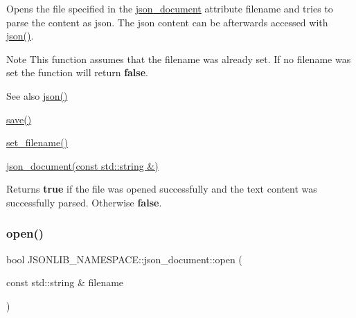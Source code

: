 Opens the file specified in the \hyperlink{classJSONLIB__NAMESPACE_1_1json__document}{json\+\_\+document} attribute {\ttfamily filename} and tries to parse the content as json. The json content can be afterwards accessed with \hyperlink{classJSONLIB__NAMESPACE_1_1json__document_ad87b8e7d68ba854dbd730758273a3b93}{json()}. 

\begin{DoxyNote}{Note}
This function assumes that the {\ttfamily filename} was already set. If no {\ttfamily filename} was set the function will return {\bfseries false}. 
\end{DoxyNote}
\begin{DoxySeeAlso}{See also}
\hyperlink{classJSONLIB__NAMESPACE_1_1json__document_ad87b8e7d68ba854dbd730758273a3b93}{json()} 

\hyperlink{classJSONLIB__NAMESPACE_1_1json__document_af8f392a0ffc779277ead1f2bdb222930}{save()} 

\hyperlink{classJSONLIB__NAMESPACE_1_1json__document_acc406344661e361c75ac7bc307057712}{set\+\_\+filename()} 

\hyperlink{classJSONLIB__NAMESPACE_1_1json__document_a3295c12f7251f1df5dc5f727a4e5b597}{json\+\_\+document(const std\+::string \&)} 
\end{DoxySeeAlso}
\begin{DoxyReturn}{Returns}
{\bfseries true} if the file was opened successfully and the text content was successfully parsed. Otherwise {\bfseries false}. 
\end{DoxyReturn}
\mbox{\label{classJSONLIB__NAMESPACE_1_1json__document_a20dc761125ccf91f7747f28a7c356be7}} 
\subsubsection{\texorpdfstring{open()}{open()}\hspace{0.1cm}{\footnotesize\ttfamily [3/4]}}
{\footnotesize\ttfamily bool J\+S\+O\+N\+L\+I\+B\+\_\+\+N\+A\+M\+E\+S\+P\+A\+C\+E\+::json\+\_\+document\+::open (\begin{DoxyParamCaption}\item[{const std\+::string \&}]{filename }\end{DoxyParamCaption})}



